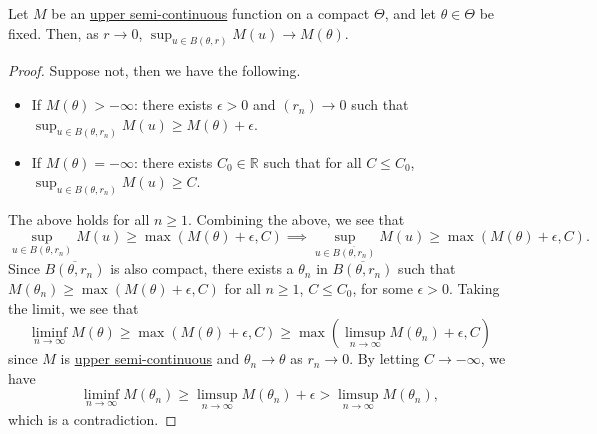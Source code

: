 \begin{proposition}\label{prop:lec25}
	Let \(M\) be an \hyperref[def:upper-semi-continuous]{upper semi-continuous} function on a compact \(\Theta \), and let \(\theta \in \Theta \) be fixed. Then, as \(r \to 0\), \(\sup _{u \in B(\theta , r)} M(u) \to M(\theta )\).
\end{proposition}
\begin{proof}
	Suppose not, then we have the following.

	\begin{itemize}
		\item If \(M(\theta ) > -\infty \): there exists \(\epsilon > 0\) and \((r_n) \to 0\) such that \(\sup _{u \in B(\theta , r_n)} M(u) \geq M(\theta ) + \epsilon\).
		\item If \(M(\theta ) = -\infty \): there exists \(C_0 \in \mathbb{R} \) such that for all \(C \leq C_0\), \(\sup _{u \in B(\theta , r_n)}M(u) \geq C\).
	\end{itemize}
	The above holds for all \(n \geq 1\). Combining the above, we see that
	\[
		\sup _{u \in B(\theta , r_n)} M(u)
		\geq \max (M(\theta ) + \epsilon , C)
		\implies \sup _{u \in \overline{B(\theta , r_n)} } M(u)
		\geq \max (M(\theta ) + \epsilon , C).
	\]
	Since \(\overline{B(\theta , r_n)} \) is also compact, there exists a \(\theta _n\) in \(\overline{B(\theta , r_n)}\) such that \(M(\theta _n) \geq \max (M(\theta ) + \epsilon , C)\) for all \(n \geq 1\), \(C \leq C_0\), for some \(\epsilon > 0\). Taking the limit, we see that
	\[
		\liminf_{n \to \infty} M(\theta )
		\geq \max (M(\theta ) + \epsilon , C)
		\geq \max \left( \limsup_{n \to \infty} M(\theta _n) + \epsilon , C \right)
	\]
	since \(M\) is \hyperref[def:upper-semi-continuous]{upper semi-continuous} and \(\theta _n \to \theta \) as \(r_n \to 0\). By letting \(C \to -\infty \), we have
	\[
		\liminf_{n \to \infty} M(\theta _n)
		\geq \limsup_{n \to \infty} M(\theta _n) + \epsilon
		> \limsup_{n \to \infty} M(\theta _n),
	\]
	which is a contradiction.
\end{proof}

